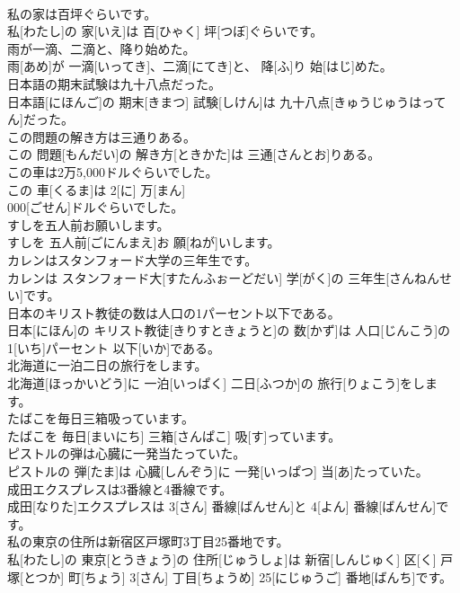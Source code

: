 \documentclass[8pt]{extreport}
\begin{document}
\begin{CJK}{UTF8}{min}
\\	私の家は百坪ぐらいです。	
\\	私[わたし]の 家[いえ]は 百[ひゃく] 坪[つぼ]ぐらいです。
\\	雨が一滴、二滴と、降り始めた。	
\\	雨[あめ]が 一滴[いってき]、二滴[にてき]と、 降[ふ]り 始[はじ]めた。
\\	日本語の期末試験は九十八点だった。	
\\	日本語[にほんご]の 期末[きまつ] 試験[しけん]は 九十八点[きゅうじゅうはってん]だった。
\\	この問題の解き方は三通りある。	
\\	この 問題[もんだい]の 解き方[ときかた]は 三通[さんとお]りある。
\\	この車は2万5,000ドルぐらいでした。	
\\	この 車[くるま]は 2[に] 万[まん] 
\\	000[ごせん]ドルぐらいでした。
\\	すしを五人前お願いします。	
\\	すしを 五人前[ごにんまえ]お 願[ねが]いします。
\\	カレンはスタンフォード大学の三年生です。	
\\	カレンは スタンフォード大[すたんふぉーどだい] 学[がく]の 三年生[さんねんせい]です。
\\	日本のキリスト教徒の数は人口の1パーセント以下である。	
\\	日本[にほん]の キリスト教徒[きりすときょうと]の 数[かず]は 人口[じんこう]の 1[いち]パーセント 以下[いか]である。
\\	北海道に一泊二日の旅行をします。	
\\	北海道[ほっかいどう]に 一泊[いっぱく] 二日[ふつか]の 旅行[りょこう]をします。
\\	たばこを毎日三箱吸っています。	
\\	たばこを 毎日[まいにち] 三箱[さんぱこ] 吸[す]っています。
\\	ピストルの弾は心臓に一発当たっていた。	
\\	ピストルの 弾[たま]は 心臓[しんぞう]に 一発[いっぱつ] 当[あ]たっていた。
\\	成田エクスプレスは3番線と4番線です。	
\\	成田[なりた]エクスプレスは 3[さん] 番線[ばんせん]と 4[よん] 番線[ばんせん]です。
\\	私の東京の住所は新宿区戸塚町3丁目25番地です。	
\\	私[わたし]の 東京[とうきょう]の 住所[じゅうしょ]は 新宿[しんじゅく] 区[く] 戸塚[とつか] 町[ちょう] 3[さん] 丁目[ちょうめ] 25[にじゅうご] 番地[ばんち]です。

\end{CJK}
\end{document}
